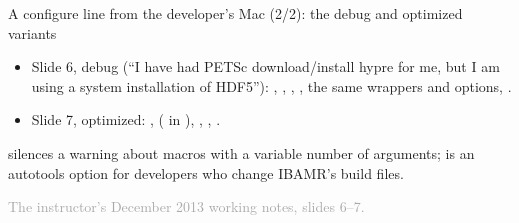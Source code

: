 \documentclass[aspectratio=169,11pt]{beamer}
\newcommand{\sourcecredit}[1]{\vfill\begin{flushright}\tiny\textcolor{DarkGray}{#1}\end{flushright}}
\begin{document}
\begin{frame}{A configure line from the developer's Mac (2/2): the debug and optimized variants}
\label{fr:mac2013b}
\small
\begin{itemize}\setlength{\itemsep}{5pt}
  \item Slide 6, debug (``I have had PETSc download/install hypre for me, but I am using a system installation of HDF5''): , , , , the same wrappers and options, .
  \item Slide 7, optimized: ,  ( in ), , , .
\end{itemize}
\vspace{2mm}
\footnotesize {} silences a warning about macros with a variable number of arguments;  is an autotools option for developers who change IBAMR's build files.
\sourcecredit{The instructor's December 2013 working notes, slides 6--7.}
\end{frame}
\end{document}
